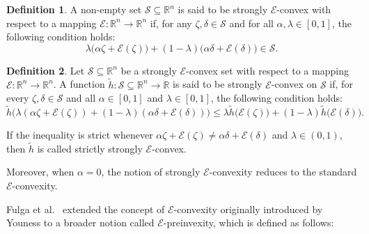 \documentclass[12pt, reqno]{amsart}
\theoremstyle{definition}
\newtheorem{definition}{Definition}[section]
\theoremstyle{remark}
\numberwithin{equation}{section}
\begin{document}
\begin{definition}
	\cite{Youness2013}\label{definition 2.5 p4}
	A non-empty set $\mathcal{S} \subseteq \mathbb{R}^n$ is said to be strongly $\mathcal{E}$-convex with respect to a mapping $\mathcal{E}: \mathbb{R}^n \rightarrow \mathbb{R}^n$ if, for any $\zeta, \delta \in \mathcal{S}$ and for all $\alpha, \lambda \in [0,1]$, the following condition holds:
\[
\lambda \big( \alpha \zeta + \mathcal{E}(\zeta) \big) + (1-\lambda) \big( \alpha \delta + \mathcal{E}(\delta) \big) \in \mathcal{S}.
\]

\end{definition}
\begin{definition}\label{defintion 2.6 p4}
	\cite{Youness2013}
	Let $\mathcal{S} \subseteq \mathbb{R}^n$ be a strongly $\mathcal{E}$-convex set with respect to a mapping $\mathcal{E}: \mathbb{R}^n \rightarrow \mathbb{R}^n$. A  function $\tilde{h}: \mathcal{S} \subseteq \mathbb{R}^n \to \mathbb{R}$ is said to be strongly $\mathcal{E}$-convex on $\mathcal{S}$ if, for every $\zeta, \delta \in \mathcal{S}$ and all $\alpha \in [0,1]$ and $\lambda \in [0,1]$, the following condition holds:
\[
\tilde{h}\Big(\lambda (\alpha \zeta + \mathcal{E}(\zeta)) + (1-\lambda)(\alpha \delta + \mathcal{E}(\delta))\Big)
\leq \lambda \tilde{h}\big(\mathcal{E}(\zeta)\big) + (1-\lambda)\tilde{h}\big(\mathcal{E}(\delta)\big).
\]

If the inequality is strict whenever $\alpha \zeta + \mathcal{E}(\zeta) \neq \alpha \delta + \mathcal{E}(\delta)$ and $\lambda \in (0,1)$, then $\tilde{h}$ is called strictly strongly $\mathcal{E}$-convex.

Moreover, when $\alpha = 0$, the notion of strongly $\mathcal{E}$-convexity reduces to the standard $\mathcal{E}$-convexity.
\end{definition}


 
Fulga et al.\ \cite{Fulga} extended the concept of $\mathcal{E}$-convexity originally introduced by Youness \cite{Youness2001a} to a broader notion called $\mathcal{E}$-preinvexity, which is defined as follows:
\end{document}
